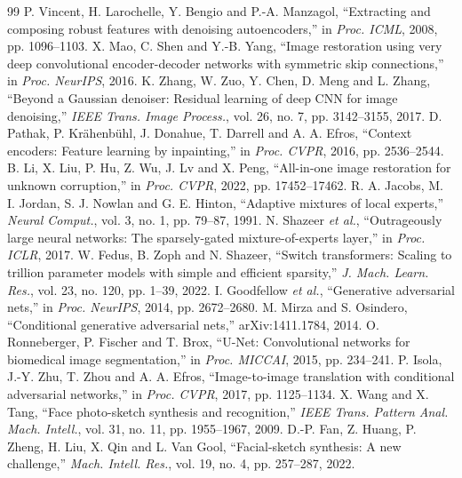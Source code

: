 \documentclass[conference]{IEEEtran}
\begin{document}
\begin{thebibliography}{99}
 P. Vincent, H. Larochelle, Y. Bengio and P.-A. Manzagol, ``Extracting and composing robust features with denoising autoencoders,'' in \emph{Proc. ICML}, 2008, pp. 1096--1103.
 X. Mao, C. Shen and Y.-B. Yang, ``Image restoration using very deep convolutional encoder-decoder networks with symmetric skip connections,'' in \emph{Proc. NeurIPS}, 2016.
 K. Zhang, W. Zuo, Y. Chen, D. Meng and L. Zhang, ``Beyond a Gaussian denoiser: Residual learning of deep CNN for image denoising,'' \emph{IEEE Trans. Image Process.}, vol. 26, no. 7, pp. 3142--3155, 2017.
 D. Pathak, P. Kr\"ahenb\"uhl, J. Donahue, T. Darrell and A. A. Efros, ``Context encoders: Feature learning by inpainting,'' in \emph{Proc. CVPR}, 2016, pp. 2536--2544.
 B. Li, X. Liu, P. Hu, Z. Wu, J. Lv and X. Peng, ``All-in-one image restoration for unknown corruption,'' in \emph{Proc. CVPR}, 2022, pp. 17452--17462.
 R. A. Jacobs, M. I. Jordan, S. J. Nowlan and G. E. Hinton, ``Adaptive mixtures of local experts,'' \emph{Neural Comput.}, vol. 3, no. 1, pp. 79--87, 1991.
 N. Shazeer \emph{et al.}, ``Outrageously large neural networks: The sparsely-gated mixture-of-experts layer,'' in \emph{Proc. ICLR}, 2017.
 W. Fedus, B. Zoph and N. Shazeer, ``Switch transformers: Scaling to trillion parameter models with simple and efficient sparsity,'' \emph{J. Mach. Learn. Res.}, vol. 23, no. 120, pp. 1--39, 2022.
 I. Goodfellow \emph{et al.}, ``Generative adversarial nets,'' in \emph{Proc. NeurIPS}, 2014, pp. 2672--2680.
 M. Mirza and S. Osindero, ``Conditional generative adversarial nets,'' arXiv:1411.1784, 2014.
 O. Ronneberger, P. Fischer and T. Brox, ``U-Net: Convolutional networks for biomedical image segmentation,'' in \emph{Proc. MICCAI}, 2015, pp. 234--241.
 P. Isola, J.-Y. Zhu, T. Zhou and A. A. Efros, ``Image-to-image translation with conditional adversarial networks,'' in \emph{Proc. CVPR}, 2017, pp. 1125--1134.
 X. Wang and X. Tang, ``Face photo-sketch synthesis and recognition,'' \emph{IEEE Trans. Pattern Anal. Mach. Intell.}, vol. 31, no. 11, pp. 1955--1967, 2009.
 D.-P. Fan, Z. Huang, P. Zheng, H. Liu, X. Qin and L. Van Gool, ``Facial-sketch synthesis: A new challenge,'' \emph{Mach. Intell. Res.}, vol. 19, no. 4, pp. 257--287, 2022.

\end{thebibliography}
\end{document}
